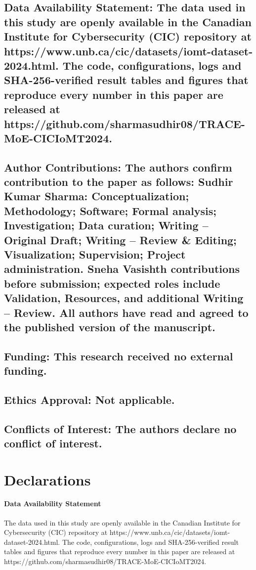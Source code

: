 \documentclass[11pt]{article}
\begin{document}
\subsection{Data Availability Statement: The data used in this study are openly available in the Canadian Institute for Cybersecurity (CIC) repository at https://www.unb.ca/cic/datasets/iomt-dataset-2024.html. The code, configurations, logs and SHA-256-verified result tables and figures that reproduce every number in this paper are released at https://github.com/sharmasudhir08/TRACE-MoE-CICIoMT2024.}
\subsection{Author Contributions: The authors confirm contribution to the paper as follows: Sudhir Kumar Sharma: Conceptualization; Methodology; Software; Formal analysis; Investigation; Data curation; Writing -- Original Draft; Writing -- Review \& Editing; Visualization; Supervision; Project administration. Sneha Vasishth contributions before submission; expected roles include Validation, Resources, and additional Writing -- Review. All authors have read and agreed to the published version of the manuscript.}
\subsection{Funding: This research received no external funding.}
\subsection{Ethics Approval: Not applicable.}
\subsection{Conflicts of Interest: The authors declare no conflict of interest.}
\section*{Declarations}
\paragraph{Data Availability Statement} The data used in this study are openly available in the Canadian Institute for Cybersecurity (CIC) repository at https://www.unb.ca/cic/datasets/iomt-dataset-2024.html. The code, configurations, logs and SHA-256-verified result tables and figures that reproduce every number in this paper are released at https://github.com/sharmasudhir08/TRACE-MoE-CICIoMT2024.
\end{document}
